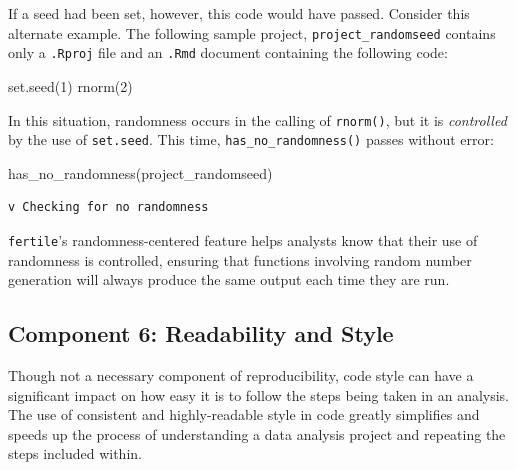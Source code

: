 \documentclass[12pt,twoside]{reedthesis}
\newenvironment{Shaded}{\begin{snugshade}}{\end{snugshade}}
\newcommand{\DecValTok}[1]{\textcolor[rgb]{0.00,0.00,0.81}{#1}}
\newcommand{\FunctionTok}[1]{\textcolor[rgb]{0.00,0.00,0.00}{#1}}
\newcommand{\NormalTok}[1]{#1}
\newcommand{\StringTok}[1]{\textcolor[rgb]{0.31,0.60,0.02}{#1}}
\begin{document}
If a seed had been set, however, this code would have passed. Consider this alternate example. The following sample project, \texttt{project\_randomseed} contains only a \texttt{.Rproj} file and an \texttt{.Rmd} document containing the following code:
\begin{Shaded}
\begin{Highlighting}[]
\FunctionTok{set.seed}\NormalTok{(}\DecValTok{1}\NormalTok{)}
\FunctionTok{rnorm}\NormalTok{(}\DecValTok{2}\NormalTok{)}
\end{Highlighting}
\end{Shaded}
In this situation, randomness occurs in the calling of \texttt{rnorm()}, but it is \emph{controlled} by the use of \texttt{set.seed}. This time, \texttt{has\_no\_randomness()} passes without error:
\begin{Shaded}
\begin{Highlighting}[]
\FunctionTok{has\_no\_randomness}\NormalTok{(}\StringTok{\textquotesingle{}project\_randomseed\textquotesingle{}}\NormalTok{)}
\end{Highlighting}
\end{Shaded}
\begin{verbatim}
v Checking for no randomness
\end{verbatim}
\texttt{fertile}'s randomness-centered feature helps analysts know that their use of randomness is controlled, ensuring that functions involving random number generation will always produce the same output each time they are run.

\hypertarget{component-6-readability-and-style}{%
\subsection{Component 6: Readability and Style}\label{component-6-readability-and-style}}

Though not a necessary component of reproducibility, code style can have a significant impact on how easy it is to follow the steps being taken in an analysis. The use of consistent and highly-readable style in code greatly simplifies and speeds up the process of understanding a data analysis project and repeating the steps included within.
\end{document}
